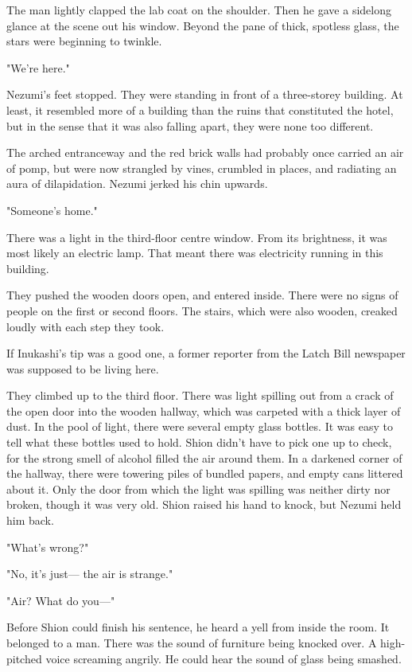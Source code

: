 The man lightly clapped the lab coat on the shoulder. Then he gave a
sidelong glance at the scene out his window. Beyond the pane of thick,
spotless glass, the stars were beginning to twinkle.

\mybreak

"We're here."

Nezumi's feet stopped. They were standing in front of a three-storey
building. At least, it resembled more of a building than the ruins that
constituted the hotel, but in the sense that it was also falling apart,
they were none too different.

The arched entranceway and the red brick walls had probably once carried
an air of pomp, but were now strangled by vines, crumbled in places, and
radiating an aura of dilapidation. Nezumi jerked his chin upwards.

"Someone's home."

\myspace

There was a light in the third-floor centre window. From its brightness,
it was most likely an electric lamp. That meant there was electricity
running in this building.

They pushed the wooden doors open, and entered inside. There were no
signs of people on the first or second floors. The stairs, which were
also wooden, creaked loudly with each step they took.

If Inukashi's tip was a good one, a former reporter from the Latch Bill
newspaper was supposed to be living here.

They climbed up to the third floor. There was light spilling out from a
crack of the open door into the wooden hallway, which was carpeted with
a thick layer of dust. In the pool of light, there were several empty
glass bottles. It was easy to tell what these bottles used to hold.
Shion didn't have to pick one up to check, for the strong smell of
alcohol filled the air around them. In a darkened corner of the hallway,
there were towering piles of bundled papers, and empty cans littered
about it. Only the door from which the light was spilling was neither
dirty nor broken, though it was very old. Shion raised his hand to
knock, but Nezumi held him back.

"What's wrong?"

"No, it's just--- the air is strange."

"Air? What do you---"

Before Shion could finish his sentence, he heard a yell from inside the
room. It belonged to a man. There was the sound of furniture being
knocked over. A high-pitched voice screaming angrily. He could hear the
sound of glass being smashed.

